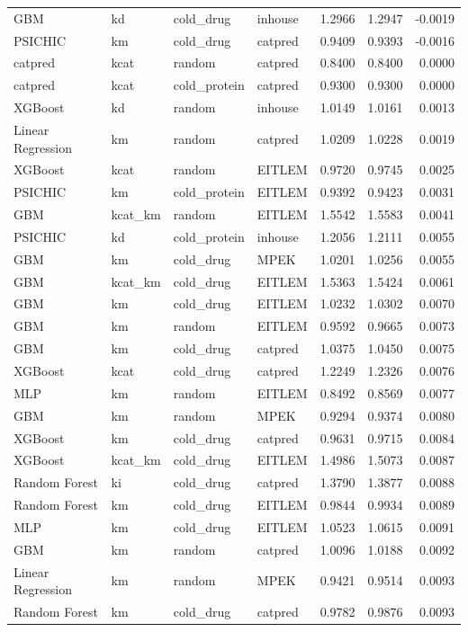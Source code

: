 \begin{tabular}{llllrrr}
GBM & kd & cold_drug & inhouse & 1.2966 & 1.2947 & -0.0019 \\
PSICHIC & km & cold_drug & catpred & 0.9409 & 0.9393 & -0.0016 \\
catpred & kcat & random & catpred & 0.8400 & 0.8400 & 0.0000 \\
catpred & kcat & cold_protein & catpred & 0.9300 & 0.9300 & 0.0000 \\
XGBoost & kd & random & inhouse & 1.0149 & 1.0161 & 0.0013 \\
Linear Regression & km & random & catpred & 1.0209 & 1.0228 & 0.0019 \\
XGBoost & kcat & random & EITLEM & 0.9720 & 0.9745 & 0.0025 \\
PSICHIC & km & cold_protein & EITLEM & 0.9392 & 0.9423 & 0.0031 \\
GBM & kcat_km & random & EITLEM & 1.5542 & 1.5583 & 0.0041 \\
PSICHIC & kd & cold_protein & inhouse & 1.2056 & 1.2111 & 0.0055 \\
GBM & km & cold_drug & MPEK & 1.0201 & 1.0256 & 0.0055 \\
GBM & kcat_km & cold_drug & EITLEM & 1.5363 & 1.5424 & 0.0061 \\
GBM & km & cold_drug & EITLEM & 1.0232 & 1.0302 & 0.0070 \\
GBM & km & random & EITLEM & 0.9592 & 0.9665 & 0.0073 \\
GBM & km & cold_drug & catpred & 1.0375 & 1.0450 & 0.0075 \\
XGBoost & kcat & cold_drug & catpred & 1.2249 & 1.2326 & 0.0076 \\
MLP & km & random & EITLEM & 0.8492 & 0.8569 & 0.0077 \\
GBM & km & random & MPEK & 0.9294 & 0.9374 & 0.0080 \\
XGBoost & km & cold_drug & catpred & 0.9631 & 0.9715 & 0.0084 \\
XGBoost & kcat_km & cold_drug & EITLEM & 1.4986 & 1.5073 & 0.0087 \\
Random Forest & ki & cold_drug & catpred & 1.3790 & 1.3877 & 0.0088 \\
Random Forest & km & cold_drug & EITLEM & 0.9844 & 0.9934 & 0.0089 \\
MLP & km & cold_drug & EITLEM & 1.0523 & 1.0615 & 0.0091 \\
GBM & km & random & catpred & 1.0096 & 1.0188 & 0.0092 \\
Linear Regression & km & random & MPEK & 0.9421 & 0.9514 & 0.0093 \\
Random Forest & km & cold_drug & catpred & 0.9782 & 0.9876 & 0.0093 \\

\end{tabular}
